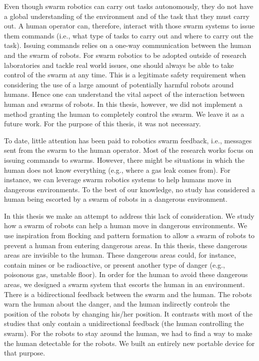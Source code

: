 \documentclass[oneside, a4paper, 12pt]{memoir}
\begin{document}
	Even though swarm robotics can carry out tasks autonomously, they do not have a global understanding of the environment and of the task that they must carry out. A human operator can, therefore, interact with those swarm systems to issue them commands (i.e., what type of tasks to carry out and where to carry out the task). Issuing commands relies on a one-way communication between the human and the swarm of robots. For swarm robotics to be adopted outside of research laboratories and tackle real world issues, one should always be able to take control of the swarm at any time. This is a legitimate safety requirement when considering the use of a large amount of potentially harmful robots around humans. Hence one can understand the vital aspect of the interaction between human and swarms of robots. In this thesis, however, we did not implement a method granting the human to completely control the swarm. We leave it as a future work. For the purpose of this thesis, it was not necessary.
	
	To date, little attention has been paid to robotics swarm feedback, i.e., messages sent from the swarm to the human operator. Most of the research works focus on issuing commands to swarms. However, there might be situations in which the human does not know everything (e.g., where a gas leak comes from). For instance, we can leverage swarm robotics systems to help humans move in dangerous environments. To the best of our knowledge, no study has considered a human being escorted by a swarm of robots in a dangerous environment.
	
	In this thesis we make an attempt to address this lack of consideration. We study how a swarm of robots can help a human move in dangerous environments. We use inspiration from flocking and pattern formation to allow a swarm of robots to prevent a human from entering dangerous areas. In this thesis, these dangerous areas are invisible to the human. These dangerous areas could, for instance, contain mines or be radioactive, or present another type of danger (e.g., poisonous gas, unstable floor). In order for the human to avoid these dangerous areas, we designed a swarm system that escorts the human in an environment. There is a bidirectional feedback between the swarm and the human. The robots warn the human about the danger, and the human indirectly controls the position of the robots by changing his/her position. It contrasts with most of the studies that only contain a unidirectional feedback (the human controlling the swarm). For the robots to stay around the human, we had to find a way to make the human detectable for the robots. We built an entirely new portable device for that purpose.
	
\end{document}
